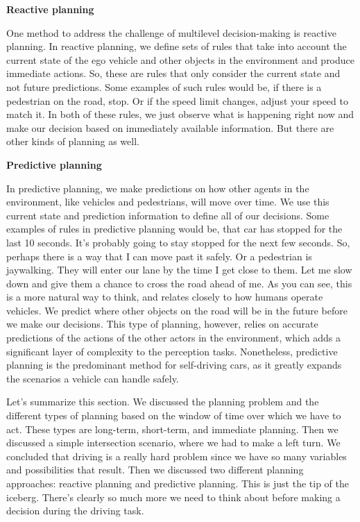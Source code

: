 {\textbf{Reactive planning}}

One method to address the challenge of multilevel decision-making is reactive planning. 
In reactive planning, we define sets of rules that take into account the current state of the ego vehicle 
and other objects in the environment and produce immediate actions. 
So, these are rules that only consider the current state and not future predictions. 
Some examples of such rules would be, if there is a pedestrian on the road, stop. 
Or if the speed limit changes, adjust your speed to match it. 
In both of these rules, we just observe what is happening right now and make our decision based on immediately available information. 
But there are other kinds of planning as well. 

{\textbf{Predictive planning}}

In predictive planning, we make predictions on how other agents in the environment, like vehicles and pedestrians, will move over time. 
We use this current state and prediction information to define all of our decisions. 
Some examples of rules in predictive planning would be, that car has stopped for the last 10 seconds. 
It's probably going to stay stopped for the next few seconds. 
So, perhaps there is a way that I can move past it safely. 
Or a pedestrian is jaywalking. 
They will enter our lane by the time I get close to them. Let me slow down and give them a chance to cross the road ahead of me. 
As you can see, this is a more natural way to think, and relates closely to how humans operate vehicles. 
We predict where other objects on the road will be in the future before we make our decisions. 
This type of planning, however, relies on accurate predictions of the actions of the other 
actors in the environment, which adds a significant layer of complexity to the perception tasks. 
Nonetheless, predictive planning is the predominant method for self-driving cars, as it greatly expands the scenarios a vehicle can handle safely. 


Let's summarize this section. We discussed the planning problem and the different types of planning based on the window of time over which we have to act. 
These types are long-term, short-term, and immediate planning. 
Then we discussed a simple intersection scenario, where we had to make a left turn. 
We concluded that driving is a really hard problem since we have so many variables and possibilities that result. 
Then we discussed two different planning approaches: reactive planning and predictive planning. 
This is just the tip of the iceberg. There's clearly so much more we need to think about before making a decision during the driving task. 
 

